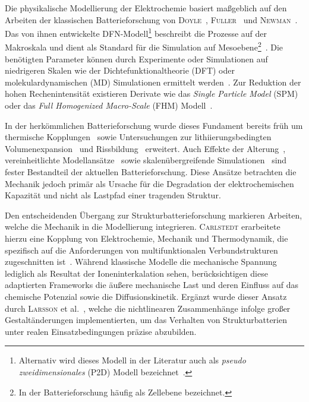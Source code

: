 Die physikalische Modellierung der Elektrochemie basiert maßgeblich auf den Arbeiten der klassischen Batterieforschung von \textsc{Doyle}~\cite{Doyle1995, Doyle2003, Ceder2002}, \textsc{Fuller}~\cite{Fuller2018, Takeuchi2008} und \textsc{Newman}~\cite{Doyle1995, Newman2021}. Das von ihnen entwickelte DFN-Modell\footnote{Alternativ wird dieses Modell in der Literatur auch als \textit{pseudo zweidimensionales} (P2D) Modell bezeichnet~\cite{Doyle1993}.} beschreibt die Prozesse auf der Makroskala und dient als Standard für die Simulation auf Mesoebene\footnote{In der Batterieforschung häufig als Zellebene bezeichnet.}~\cite{Doyle1993, Newman2021}. Die benötigten Parameter können durch Experimente oder Simulationen auf niedrigeren Skalen wie der Dichtefunktionaltheorie (DFT) oder molekulardynamischen (MD) Simulationen ermittelt werden~\cite{Chen2022}. Zur Reduktion der hohen Rechenintensität existieren Derivate wie das \textit{Single Particle Model} (SPM)~\cite{Li2017} oder das \textit{Full Homogenized Macro-Scale} (FHM) Modell~\cite{Arunachalam2019}.

In der herkömmlichen Batterieforschung wurde dieses Fundament bereits früh um thermische Kopplungen~\cite{Pals1995, Pals1995a, Chen2005, Onda2006, Kim2013, Gao2021, Liu2023} sowie Untersuchungen zur lithiierungsbedingten Volumenexpansion~\cite{Bower2011, Yang2014, Roberts2014, Pereira2019, Mai2019, Li2020, Hoeschele2023} und Rissbildung~\cite{Dionisi2017, Wang2020a, Pistorio2023} erweitert. Auch Effekte der Alterung~\cite{RedondoIglesias2020}, vereinheitlichte Modellansätze~\cite{Wu2014, Kim2018, Liu2020, Yin2020} sowie skalenübergreifende Simulationen~\cite{Liu2019, Li2020a, Katrasnik2021} sind fester Bestandteil der aktuellen Batterieforschung. Diese Ansätze betrachten die Mechanik jedoch primär als Ursache für die Degradation der elektrochemischen Kapazität und nicht als Lastpfad einer tragenden Struktur.

Den entscheidenden Übergang zur Strukturbatterieforschung markieren Arbeiten, welche die Mechanik in die Modellierung integrieren. \textsc{Carlstedt} erarbeitete hierzu eine Kopplung von Elektrochemie, Mechanik und Thermodynamik, die spezifisch auf die Anforderungen von multifunktionalen Verbundstrukturen zugeschnitten ist~\cite{Carlstedt2019, Carlstedt2019a, Carlstedt2019b, Carlstedt2020, Carlstedt2020b, Carlstedt2022, Carlstedt2022a, Carlstedt2022b}. Während klassische Modelle die mechanische Spannung lediglich als Resultat der Ioneninterkalation sehen, berücksichtigen diese adaptierten Frameworks die äußere mechanische Last und deren Einfluss auf das chemische Potenzial sowie die Diffusionskinetik. Ergänzt wurde dieser Ansatz durch \textsc{Larsson} et al.~\cite{Larsson2023}, welche die nichtlinearen Zusammenhänge infolge großer Gestaltänderungen implementierten, um das Verhalten von Strukturbatterien unter realen Einsatzbedingungen präzise abzubilden. 

